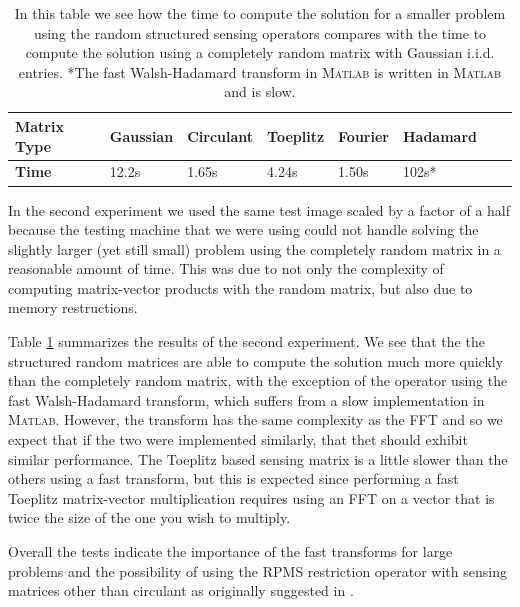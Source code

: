 \begin{table}[h] \begin{tabular}{l|lllllll} \textbf{Matrix Type} & Gaussian &
		Circulant & Toeplitz & Fourier & Hadamard \\ \hline \textbf{Time}        &
		12.2s    & 1.65s     & 4.24s    & 1.50s   & 102s*    \\ \end{tabular}
	\label{tab:times} \caption{ In this table we see how the time to compute the
		solution for a smaller problem using the random structured sensing
		operators compares with the time to compute the solution using a completely
		random matrix with Gaussian i.i.d. entries. *The fast Walsh-Hadamard
		transform in \textsc{Matlab} is written in \textsc{Matlab} and is slow.}
	\end{table}

In the second experiment we used the same test image scaled by a factor of a
half because the testing machine that we were using could not handle solving
the slightly larger (yet still small) problem using the completely random
matrix in  a reasonable amount of time. This was due to not only the complexity
of computing matrix-vector products with the random matrix, but also due to
memory restructions.

Table \ref{tab:times} summarizes the results of the second experiment. We see
that the the structured random matrices are able to compute the solution much
more quickly than the completely random matrix, with the exception of the
operator using the fast Walsh-Hadamard transform, which suffers from a slow
implementation in \textsc{Matlab}. However, the transform has the same
complexity as the FFT and so we expect that if the two were implemented
similarly, that thet should exhibit similar performance.  The Toeplitz based
sensing matrix is a little slower than the others using a fast transform, but
this is expected since performing a fast Toeplitz matrix-vector multiplication
requires using an FFT on a vector that is twice the size of the one you wish to
multiply. 

Overall the tests indicate the importance of the fast transforms for large
problems and the possibility of using the RPMS restriction operator with
sensing matrices other than circulant as originally suggested in
\cite{romberg2009}.
